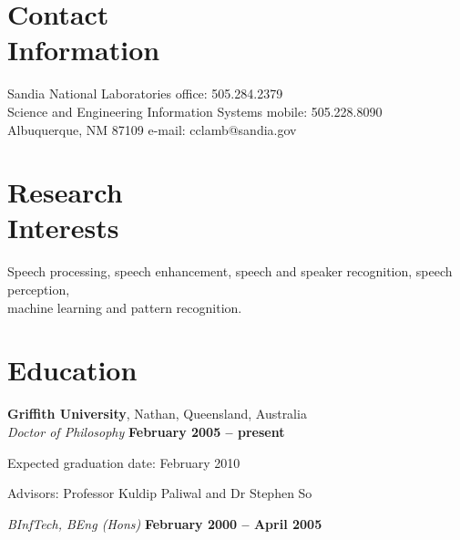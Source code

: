 \documentclass[margin,line]{resume}
\begin{document}
\begin{resume}

    \section{\mysidestyle Contact\\Information}

    Sandia National Laboratories					\hfill office: 505.284.2379				\vspace{0mm}\\\vspace{0mm}%
    Science and Engineering Information Systems	\hfill mobile: 505.228.8090      		\vspace{0mm}\\\vspace{0mm}%
    Albuquerque, NM 87109						\hfill e-mail: cclamb@sandia.gov		  	\vspace{0mm}\\\vspace{-4.5mm}%


    \section{\mysidestyle Research\\Interests}

    Speech processing, speech enhancement, speech and speaker recognition, speech perception, \\ 
    machine learning and pattern recognition.


    \section{\mysidestyle Education}

    \textbf{Griffith University}, Nathan, Queensland, Australia \vspace{2mm}\\\vspace{1mm}%
    \textsl{Doctor of Philosophy} \hfill \textbf{ February 2005 -- present}\vspace{-3mm}\\\vspace{-1mm}%
    \begin{list2}
        \item Expected graduation date: February 2010
        \item Advisors:  Professor Kuldip Paliwal and Dr Stephen So
    \end{list2}\vspace{-1.5mm}
    \textsl{BInfTech, BEng (Hons)} \hfill \textbf{February 2000 -- April 2005}\vspace{-3mm}\\\vspace{-1mm}%



\end{resume}
\end{document}
